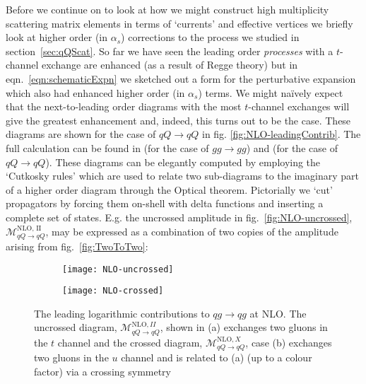 		Before we continue on to look at how we might construct high multiplicity scattering matrix
		elements in terms of `currents' and effective vertices we briefly look at higher order (in
		$\alpha_s$) corrections to the process we studied in section~\ref{sec:qQScat}.
		So far we have seen the leading order \emph{processes} with a $t$-channel exchange are enhanced (as a result
		of Regge theory) but in
		eqn.~\eqref{eqn:schematicExpn} we sketched out a form for the perturbative expansion which also
		had enhanced higher order (in $\alpha_s$) terms.  We might na\"ively expect that the next-to-leading
		order diagrams with the most $t$-channel exchanges will give the greatest enhancement and, indeed,
		this turns out to be the case.  These diagrams are shown for the case of $qQ\rightarrow qQ$ in fig.
		\eqref{fig:NLO-leadingContrib}. The full calculation can be found in \cite{DelDuca:1995hf} (for
		the case of $gg\rightarrow gg$) and \cite{sabioThesis} (for the case of $qQ\rightarrow qQ$).  These
		diagrams can be elegantly computed by employing the `Cutkosky rules' which are used to relate two
		sub-diagrams to the imaginary part of a higher order diagram through the Optical theorem.  Pictorially
		we `cut' propagators by forcing them on-shell with delta functions and inserting a complete set of
		states.  E.g. the uncrossed amplitude in fig.~\eqref{fig:NLO-uncrossed},
		$\mathcal{M}_{qQ\rightarrow qQ}^{\text{NLO, II}}$, may be expressed as a combination of two copies
		of the amplitude arising from fig.~\eqref{fig:TwoToTwo}:

		\begin{figure}[tpb]

			\centering
			\begin{subfigure}[b]{0.48\textwidth}
				\texttt{[image: NLO-uncrossed]}
				\caption{}
				\label{fig:NLO-uncrossed}
			\end{subfigure}
			\begin{subfigure}[b]{0.48\textwidth}
				\texttt{[image: NLO-crossed]}
				\caption{}
				\label{fig:NLO-crossed}
			\end{subfigure}
			\caption{The leading logarithmic contributions to $qg\rightarrow qg$ at NLO.  The uncrossed
 			         diagram, $\mathcal{M}_{qQ\rightarrow qQ}^{\text{NLO}, II}$, shown in (a) exchanges
 			         two gluons in the $t$ channel and the crossed diagram,
 			         $\mathcal{M}_{qQ\rightarrow qQ}^{\text{NLO}, X}$, case (b) exchanges two gluons
 			         in the $u$ channel and is related to (a) (up to a colour factor) via a crossing
 			         symmetry}
			\label{fig:NLO-leadingContrib}
		\end{figure}

